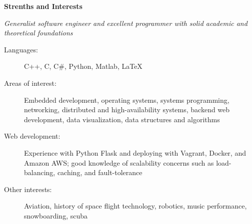 \documentclass[letterpaper,11pt]{article}
\newcommand{\resheading}[1]{{\large \colorbox{mygrey}{\begin{minipage}{\textwidth}{\textbf{#1 \vphantom{p\^{E}}}}\end{minipage}}}}
\begin{document}
\resheading{Strenths and Interests}
	\textit{Generalist software engineer and excellent programmer with solid academic and theoretical foundations}
	\begin{description}
		\item[Languages:] { \footnotesize C++, C, C\#, Python, Matlab, \LaTeX}
		\item[Areas of interest:] { \footnotesize Embedded development, operating systems, systems programming, networking, distributed and high-availability systems, backend web development, data visualization, data structures and algorithms}
		\item[Web development:]  { \footnotesize Experience with Python Flask and deploying with Vagrant, Docker, and Amazon AWS; good knowledge of scalability concerns such as load-balancing, caching, and fault-tolerance }
		\item[Other interests:] { \footnotesize Aviation, history of space flight technology, robotics, music performance, snowboarding, scuba }
	\end{description} %
	
\end{document}
